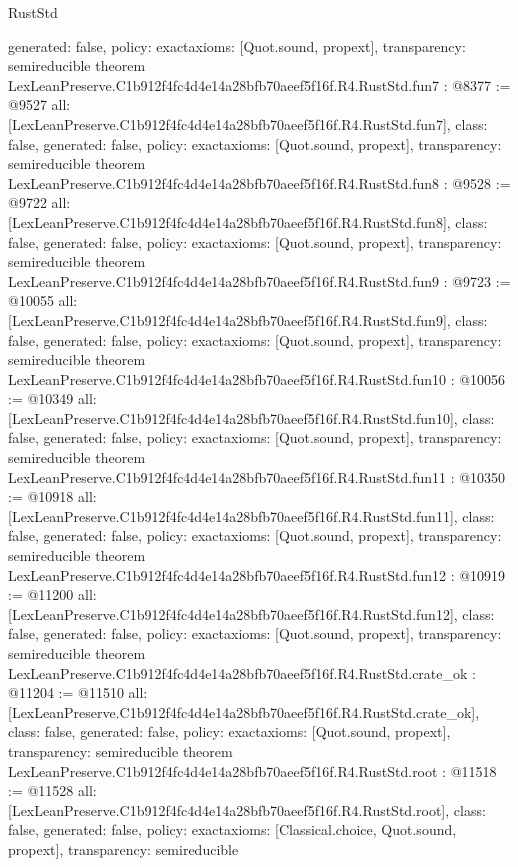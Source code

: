 \begin{lexlean}{RustStd}
\begin{coremodule}
{  generated: false,
  policy: exact{axioms: [Quot.sound, propext]},
  transparency: semireducible
}
theorem LexLeanPreserve.C1b912f4fc4d4e14a28bfb70aeef5f16f.R4.RustStd.fun7 : @8377 := @9527 {
  all: [LexLeanPreserve.C1b912f4fc4d4e14a28bfb70aeef5f16f.R4.RustStd.fun7],
  class: false,
  generated: false,
  policy: exact{axioms: [Quot.sound, propext]},
  transparency: semireducible
}
theorem LexLeanPreserve.C1b912f4fc4d4e14a28bfb70aeef5f16f.R4.RustStd.fun8 : @9528 := @9722 {
  all: [LexLeanPreserve.C1b912f4fc4d4e14a28bfb70aeef5f16f.R4.RustStd.fun8],
  class: false,
  generated: false,
  policy: exact{axioms: [Quot.sound, propext]},
  transparency: semireducible
}
theorem LexLeanPreserve.C1b912f4fc4d4e14a28bfb70aeef5f16f.R4.RustStd.fun9 : @9723 := @10055 {
  all: [LexLeanPreserve.C1b912f4fc4d4e14a28bfb70aeef5f16f.R4.RustStd.fun9],
  class: false,
  generated: false,
  policy: exact{axioms: [Quot.sound, propext]},
  transparency: semireducible
}
theorem LexLeanPreserve.C1b912f4fc4d4e14a28bfb70aeef5f16f.R4.RustStd.fun10 : @10056 := @10349 {
  all: [LexLeanPreserve.C1b912f4fc4d4e14a28bfb70aeef5f16f.R4.RustStd.fun10],
  class: false,
  generated: false,
  policy: exact{axioms: [Quot.sound, propext]},
  transparency: semireducible
}
theorem LexLeanPreserve.C1b912f4fc4d4e14a28bfb70aeef5f16f.R4.RustStd.fun11 : @10350 := @10918 {
  all: [LexLeanPreserve.C1b912f4fc4d4e14a28bfb70aeef5f16f.R4.RustStd.fun11],
  class: false,
  generated: false,
  policy: exact{axioms: [Quot.sound, propext]},
  transparency: semireducible
}
theorem LexLeanPreserve.C1b912f4fc4d4e14a28bfb70aeef5f16f.R4.RustStd.fun12 : @10919 := @11200 {
  all: [LexLeanPreserve.C1b912f4fc4d4e14a28bfb70aeef5f16f.R4.RustStd.fun12],
  class: false,
  generated: false,
  policy: exact{axioms: [Quot.sound, propext]},
  transparency: semireducible
}
theorem LexLeanPreserve.C1b912f4fc4d4e14a28bfb70aeef5f16f.R4.RustStd.crate_ok : @11204 := @11510 {
  all: [LexLeanPreserve.C1b912f4fc4d4e14a28bfb70aeef5f16f.R4.RustStd.crate_ok],
  class: false,
  generated: false,
  policy: exact{axioms: [Quot.sound, propext]},
  transparency: semireducible
}
theorem LexLeanPreserve.C1b912f4fc4d4e14a28bfb70aeef5f16f.R4.RustStd.root : @11518 := @11528 {
  all: [LexLeanPreserve.C1b912f4fc4d4e14a28bfb70aeef5f16f.R4.RustStd.root],
  class: false,
  generated: false,
  policy: exact{axioms: [Classical.choice, Quot.sound, propext]},
  transparency: semireducible
}


\end{coremodule}
\end{lexlean}
